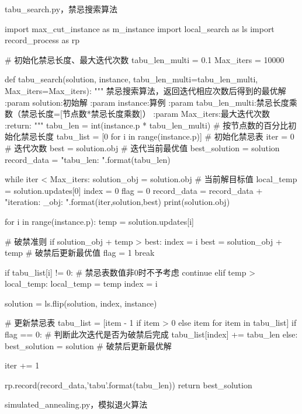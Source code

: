 \documentclass{article}
\begin{document}
    tabu\_search.py，禁忌搜索算法
    \begin{python}
import max_cut_instance as m_instance
import local_search as ls
import record_process as rp

# 初始化禁忌长度、最大迭代次数
tabu_len_multi = 0.1
Max_iters = 10000

def tabu_search(solution, instance, tabu_len_multi=tabu_len_multi, Max_iters=Max_iters):
    """
    禁忌搜索算法，返回迭代相应次数后得到的最优解
    :param solution:初始解
    :param instance:算例
    :param tabu_len_multi:禁忌长度乘数（禁忌长度=[节点数*禁忌长度乘数]）
    :param Max_iters:最大迭代次数
    :return:
    """
    tabu_len = int(instance.p * tabu_len_multi)  # 按节点数的百分比初始化禁忌长度
    tabu_list = [0 for i in range(instance.p)]  # 初始化禁忌表
    iter = 0  # 迭代次数
    best = solution.obj # 迭代当前最优值
    best_solution = solution
    record_data = "tabu_len: {}\n\n".format(tabu_len)

    while iter < Max_iters:
        solution_obj = solution.obj  # 当前解目标值
        local_temp = solution.updates[0]
        index = 0
        flag = 0
        record_data = record_data + "iteration: {}\n{}\nbest_obj: {}\n\n".format(iter,solution,best)
        print(solution.obj)

        for i in range(instance.p):
            temp = solution.updates[i]

            # 破禁准则
            if solution_obj + temp > best:
                index = i
                best = solution_obj + temp  # 破禁后更新最优值
                flag = 1
                break

            if tabu_list[i] != 0:  # 禁忌表数值非0时不予考虑
                continue
            elif temp > local_temp:
                local_temp = temp
                index = i

        solution = ls.flip(solution, index, instance)

        # 更新禁忌表
        tabu_list = [item - 1 if item > 0 else item for item in tabu_list]
        if flag == 0:  # 判断此次迭代是否为破禁后完成
            tabu_list[index] += tabu_len
        else:
            best_solution = solution  # 破禁后更新最优解

        iter += 1

    rp.record(record_data,'tabu{}'.format(tabu_len))
    return best_solution    
    \end{python}
    simulated\_annealing.py，模拟退火算法
\end{document}
